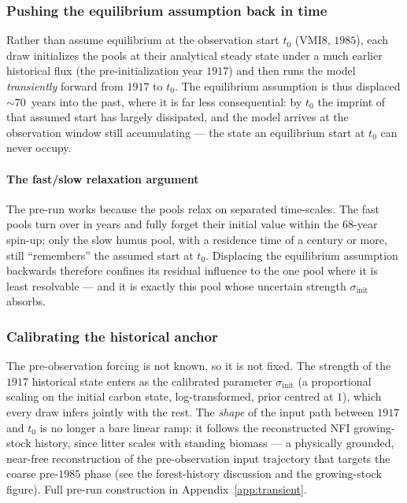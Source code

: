 \documentclass[11pt]{article}
\begin{document}
\subsubsection{Pushing the equilibrium assumption back in time}
Rather than assume equilibrium at the observation start $t_0$ (VMI8, $1985$),
each draw initializes the pools at their analytical steady state under a much
earlier historical flux (the pre-initialization year $1917$) and then runs the
model \emph{transiently} forward from $1917$ to $t_0$. The equilibrium
assumption is thus displaced $\sim\!70$~years into the past, where it is far
less consequential: by $t_0$ the imprint of that assumed start has largely
dissipated, and the model arrives at the observation window still accumulating
--- the state an equilibrium start at $t_0$ can never occupy.

\paragraph{The fast/slow relaxation argument}
The pre-run works because the pools relax on separated time-scales. The fast
pools turn over in years and fully forget their initial value within the
$68$-year spin-up; only the slow humus pool, with a residence time of a century
or more, still ``remembers'' the assumed start at $t_0$. Displacing the
equilibrium assumption backwards therefore confines its residual influence to
the one pool where it is least resolvable --- and it is exactly this pool whose
uncertain strength $\sigma_{\mathrm{init}}$ absorbs.

\subsubsection{Calibrating the historical anchor}
The pre-observation forcing is not known, so it is not fixed. The strength of
the $1917$ historical state enters as the calibrated parameter
$\sigma_{\mathrm{init}}$ (a proportional scaling on the initial carbon state,
log-transformed, prior centred at $1$), which every draw infers jointly with
the rest. The \emph{shape} of the input path between $1917$ and $t_0$ is no
longer a bare linear ramp: it follows the reconstructed NFI growing-stock
history, since
litter scales with standing biomass --- a physically grounded, near-free
reconstruction of the pre-observation input trajectory that targets the coarse
pre-$1985$ phase (see the forest-history discussion and the growing-stock
figure). Full pre-run construction in Appendix~\ref{app:transient}.
\end{document}
